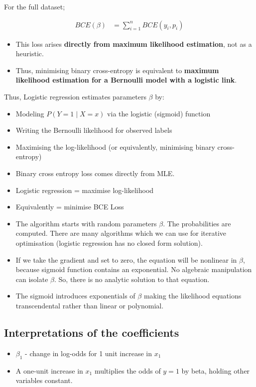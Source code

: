 \documentclass[10pt,a4paper]{article}
\begin{document}
	For the full dataset;

	\begin{align*}
		BCE(\beta)&= \sum_{i=1}^{n} BCE(y_i, p_i)
	\end{align*}


	\begin{itemize}
		\item This loss arises \textbf{directly from maximum likelihood estimation}, not as a heuristic.
		\item Thus, minimising binary cross-entropy is equivalent to \textbf{maximum likelihood estimation for a Bernoulli model with a logistic link}.
	\end{itemize}

	Thus, Logistic regression estimates parameters $\beta$ by:
	\begin{itemize}
		\item Modeling $P(Y=1 \mid X=x)$ via the logistic (sigmoid) function
		\item Writing the Bernoulli likelihood for observed labels
		\item Maximising the log-likelihood (or equivalently, minimising binary cross-entropy)
	\end{itemize}

	\begin{itemize}
		\item Binary cross entropy loss comes directly from MLE.
		\item Logistic regression = maximise log-likelihood
		\item Equivalently = minimise BCE Loss
		\item The algorithm starts with random parameters $\beta$. The probabilities are computed. There are many algorithms which we can use for iterative optimisation (logistic regression has no closed form solution).
		\item If we take the gradient and set to zero, the equation will be nonlinear in $\beta$, because sigmoid function contains an exponential. No algebraic manipulation can isolate $\beta$. So, there is no analytic solution to that equation.
		\item The sigmoid introduces exponentials of $\beta$ making the likelihood equations transcendental rather than linear or polynomial.
	\end{itemize}

	\subsection{Interpretations of the coefficients}
	\begin{itemize}
		\item $\beta_1$ - change in log-odds for 1 unit increase in $x_1$
		\item A one-unit increase in $x_1$ multiplies the odds of $y=1$ by beta, holding other variables constant.
	\end{itemize}
\end{document}
